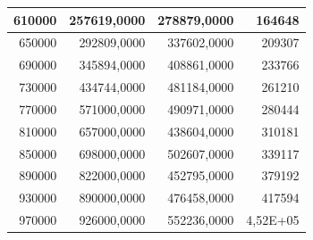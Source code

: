 \documentclass[a4paper, 12pt]{article}
\begin{document}
\begin{longtable}[c]{@{}rrrr@{}}
	\multicolumn{1}{|r|}{610000}                  & \multicolumn{1}{r|}{257619,0000}            & \multicolumn{1}{r|}{278879,0000}                                                       & \multicolumn{1}{r|}{164648}                                                            \\* \midrule
	\multicolumn{1}{|r|}{650000}                  & \multicolumn{1}{r|}{292809,0000}            & \multicolumn{1}{r|}{337602,0000}                                                       & \multicolumn{1}{r|}{209307}                                                            \\* \midrule
	\multicolumn{1}{|r|}{690000}                  & \multicolumn{1}{r|}{345894,0000}            & \multicolumn{1}{r|}{408861,0000}                                                       & \multicolumn{1}{r|}{233766}                                                            \\* \midrule
	\multicolumn{1}{|r|}{730000}                  & \multicolumn{1}{r|}{434744,0000}            & \multicolumn{1}{r|}{481184,0000}                                                       & \multicolumn{1}{r|}{261210}                                                            \\* \midrule
	\multicolumn{1}{|r|}{770000}                  & \multicolumn{1}{r|}{571000,0000}            & \multicolumn{1}{r|}{490971,0000}                                                       & \multicolumn{1}{r|}{280444}                                                            \\* \midrule
	\multicolumn{1}{|r|}{810000}                  & \multicolumn{1}{r|}{657000,0000}            & \multicolumn{1}{r|}{438604,0000}                                                       & \multicolumn{1}{r|}{310181}                                                            \\* \midrule
	\multicolumn{1}{|r|}{850000}                  & \multicolumn{1}{r|}{698000,0000}            & \multicolumn{1}{r|}{502607,0000}                                                       & \multicolumn{1}{r|}{339117}                                                            \\* \midrule
	\multicolumn{1}{|r|}{890000}                  & \multicolumn{1}{r|}{822000,0000}            & \multicolumn{1}{r|}{452795,0000}                                                       & \multicolumn{1}{r|}{379192}                                                            \\* \midrule
	\multicolumn{1}{|r|}{930000}                  & \multicolumn{1}{r|}{890000,0000}            & \multicolumn{1}{r|}{476458,0000}                                                       & \multicolumn{1}{r|}{417594}                                                            \\* \midrule
	\multicolumn{1}{|r|}{970000}                  & \multicolumn{1}{r|}{926000,0000}            & \multicolumn{1}{r|}{552236,0000}                                                       & \multicolumn{1}{r|}{4,52E+05}                                                          \\* \bottomrule
\end{longtable}
\end{document}
